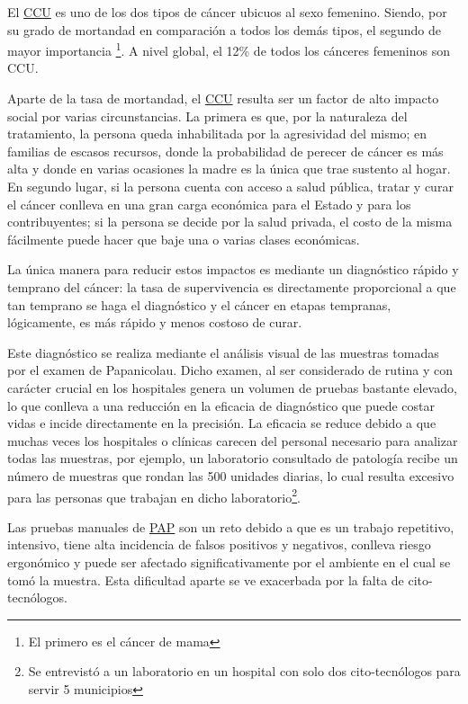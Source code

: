 El \hyperlink{abbr}{CCU} es uno de los dos tipos de cáncer ubicuos al sexo
femenino. Siendo, por su grado de mortandad en comparación a todos los demás
tipos, el segundo de mayor importancia \footnote{El primero es el cáncer de
mama}. A nivel global,  el 12\% de todos los cánceres femeninos son
CCU.~\cite{CancerToday-InstitutionalAgencyforResearchonCancerWHO2018}

Aparte de la tasa de mortandad, el \hyperlink{abbr}{CCU} resulta ser un factor
de alto impacto social por varias circunstancias. La primera es que, por la
naturaleza del tratamiento, la persona queda inhabilitada por la agresividad del
mismo; en familias de escasos recursos, donde la probabilidad de perecer de
cáncer es más alta y donde en varias ocasiones la madre es la única que trae
sustento al hogar. En segundo lugar, si la persona cuenta con acceso a salud
pública, tratar y curar el cáncer conlleva en una gran carga económica para el
Estado y para los contribuyentes; si la persona se decide por la salud privada,
el costo de la misma fácilmente puede hacer que baje una o varias clases
económicas.~\cite{SecretariadeSalud2015a}

La única manera para reducir estos impactos es mediante un diagnóstico rápido y
temprano del cáncer: la tasa de supervivencia es directamente proporcional a que
tan temprano se haga el diagnóstico y el cáncer en etapas tempranas,
lógicamente, es más rápido y menos costoso de curar.~\cite{WorldHealthOrganization}

Este diagnóstico se realiza mediante el análisis visual de las muestras tomadas
por el examen de Papanicolau. Dicho examen, al ser considerado de rutina y con
carácter crucial en los hospitales genera un volumen de pruebas bastante
elevado, lo que conlleva a una reducción en la eficacia de diagnóstico que puede
costar vidas e incide directamente en la precisión. La eficacia se reduce debido
a que muchas veces los hospitales o clínicas carecen del personal necesario para
analizar todas las muestras, por ejemplo, un laboratorio consultado de patología
recibe un número de muestras que rondan las 500 unidades diarias, lo cual
resulta excesivo para las personas que trabajan en dicho laboratorio\footnote{Se
entrevistó a un laboratorio en un hospital con solo dos cito-tecnólogos para
servir 5 municipios}.~\cite{DelMoral2017} 

Las pruebas manuales de \hyperlink{abbr}{PAP} son un reto debido a que es un
trabajo repetitivo, intensivo, tiene alta incidencia de falsos positivos y
negativos, conlleva riesgo ergonómico y puede ser afectado significativamente
por el ambiente en el cual se tomó la muestra. Esta dificultad aparte se ve
exacerbada por la falta de cito-tecnólogos.~\cite{Cucoranu2014}

